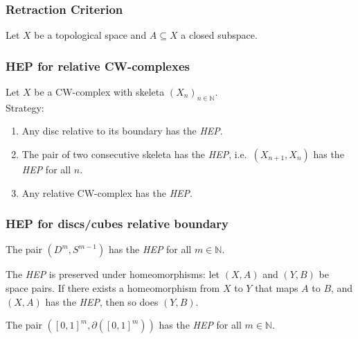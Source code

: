 \documentclass{beamer}
\begin{document}
\begin{frame}
\frametitle{Retraction Criterion}
Let $X$ be a topological space and $A \subseteq X$ a closed subspace.
\begin{center}
\end{center}
\end{frame}

\begin{frame}
\frametitle{HEP for relative CW-complexes}
Let $X$ be a CW-complex with skeleta $(X_n)_{n \in \mathbb{N}}$. \\
Strategy:
\begin{enumerate}
    \item Any disc relative to its boundary has the \emph{HEP}.
    \item The pair of two consecutive skeleta has the \emph{HEP}, i.e.\ $(X_{n+1},X_n)$ has the \emph{HEP} for all $n$.
    \item Any relative CW-complex has the \emph{HEP}.
\end{enumerate}
\end{frame}

\begin{frame}
\frametitle{HEP for discs/cubes relative boundary}
\begin{theorem} 
The pair $(D^m, S^{m-1})$ has the \emph{HEP} for all $m \in \mathbb{N}$.
\end{theorem} \pause
\begin{theorem}
    The \emph{HEP} is preserved under homeomorphisms: let $(X,A)$ and $(Y,B)$ be space pairs. If there exists a homeomorphism from $X$ to $Y$ that maps $A$ to $B$, and $(X,A)$ has the \emph{HEP}, then so does $(Y,B)$.
\end{theorem} \pause
\begin{theorem}
The pair $([0,1]^m, \partial ([0,1]^m))$ has the \emph{HEP} for all $m \in \mathbb{N}$.
\end{theorem} 
\end{frame}
\end{document}
